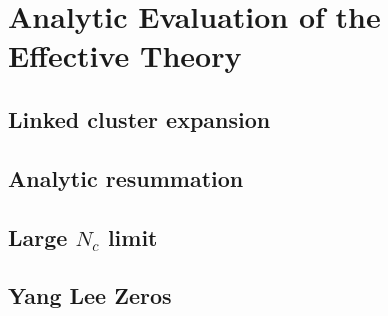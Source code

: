 \chapter{Analytic Evaluation of the Effective Theory} \label{chap5}

\section{Linked cluster expansion}
\section{Analytic resummation}
\section{Large \texorpdfstring{$N_c$}{Nc} limit}
\section{Yang Lee Zeros}
